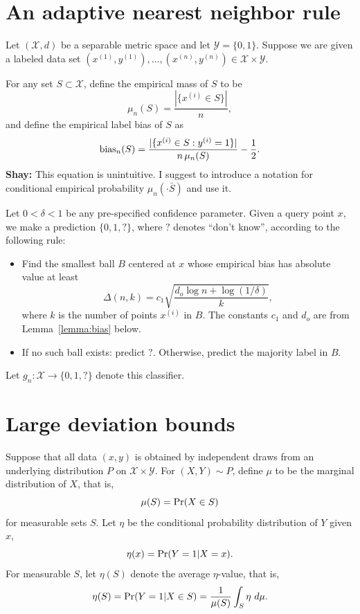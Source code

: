 \documentclass{article}
\def\pr{{\rm Pr}}
\def\X{{\mathcal X}}
\def\Y{{\mathcal Y}}
\def\bias{{\rm bias}}
\newcommand{\shay}[1]{{\color{purple} {\bf Shay:} #1}}
\begin{document}
\section{An adaptive nearest neighbor rule}

Let $(\X,d)$ be a separable metric space and let $\Y = \{0,1\}$. Suppose we are given a labeled data set $(x^{(1)}, y^{(1)}), \ldots, (x^{(n)}, y^{(n)}) \in \X \times \Y$.

For any set $S \subset \X$, define the empirical mass of $S$ to be
\begin{equation}
\mu_n(S) = \frac{|\{x^{(i)} \in S\}|}{n} ,
\label{eq:empirical-mass}
\end{equation}
and define the empirical label bias of $S$ as
\begin{equation}
\bias_n(S) = \frac{|\{x^{(i)} \in S: y^{(i)} = 1\}|}{n \, \mu_n(S)} - \frac{1}{2}.
\label{eq:empirical-bias}
\end{equation}
\shay{This equation is unintuitive. I suggest to introduce a notation for conditional empirical probability $\mu_n(\cdot \bar S)$ and use it.}

Let $0 < \delta < 1$ be any pre-specified confidence parameter. Given a query point $x$, we make a prediction $\{0,1,?\}$, where $?$ denotes ``don't know'', according to the following rule:
\begin{itemize}
\item Find the smallest ball $B$ centered at $x$ whose empirical bias has absolute value at least
$$ \Delta(n,k) = c_1 \sqrt{\frac{d_o \log n + \log (1/\delta)}{k}}, $$
where $k$ is the number of points $x^{(i)}$ in $B$. The constants $c_1$ and $d_o$ are from Lemma~\ref{lemma:bias} below.
\item If no such ball exists: predict ?. Otherwise, predict the majority label in $B$.
\end{itemize}
Let $g_n: \X \rightarrow \{0,1,?\}$ denote this classifier.

\section{Large deviation bounds}

Suppose that all data $(x,y)$ is obtained by independent draws from an underlying distribution $P$ on $\X \times \Y$. For $(X,Y) \sim P$, define $\mu$ to be the marginal distribution of $X$, that is,
$$ \mu(S) = \pr(X \in S) $$
for measurable sets $S$. Let $\eta$ be the conditional probability distribution of $Y$ given $x$,
$$ \eta(x) = \pr(Y = 1| X = x) .$$
For measurable $S$, let $\eta(S)$ denote the average $\eta$-value, that is,
$$ \eta(S) = \pr(Y = 1| X \in S) = \frac{1}{\mu(S)} \int_S \eta \ d \mu .$$
\end{document}
